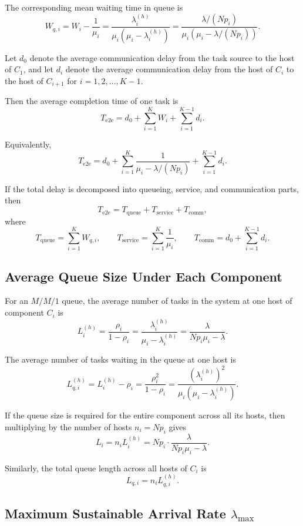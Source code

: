 \documentclass[12pt,a4paper]{article}
\begin{document}
The corresponding mean waiting time in queue is
\[
W_{q,i} = W_i - \frac{1}{\mu_i}
       = \frac{\lambda_i^{(h)}}{\mu_i\left(\mu_i-\lambda_i^{(h)}\right)}
       = \frac{\lambda/(Np_i)}{\mu_i\left(\mu_i-\lambda/(Np_i)\right)}.
\]

Let $d_0$ denote the average communication delay from the task source to the host of $C_1$, and let $d_i$ denote the average communication delay from the host of $C_i$ to the host of $C_{i+1}$ for $i=1,2,\dots,K-1$.

Then the average completion time of one task is
\[
T_{\text{e2e}} = d_0 + \sum_{i=1}^{K} W_i + \sum_{i=1}^{K-1} d_i.
\]

Equivalently,
\[
T_{\text{e2e}} = d_0 + \sum_{i=1}^{K} \frac{1}{\mu_i - \lambda/(Np_i)}
    + \sum_{i=1}^{K-1} d_i.
\]

If the total delay is decomposed into queueing, service, and communication parts, then
\[
T_{\text{e2e}} = T_{\text{queue}} + T_{\text{service}} + T_{\text{comm}},
\]
where
\[
T_{\text{queue}} = \sum_{i=1}^{K} W_{q,i}, \qquad
T_{\text{service}} = \sum_{i=1}^{K} \frac{1}{\mu_i}, \qquad
T_{\text{comm}} = d_0 + \sum_{i=1}^{K-1} d_i.
\]

\subsection{Average Queue Size Under Each Component}

For an $M/M/1$ queue, the average number of tasks in the system at one host of component $C_i$ is
\[
L_i^{(h)} = \frac{\rho_i}{1-\rho_i}
          = \frac{\lambda_i^{(h)}}{\mu_i - \lambda_i^{(h)}}
          = \frac{\lambda}{Np_i\mu_i - \lambda}.
\]

The average number of tasks waiting in the queue at one host is
\[
L_{q,i}^{(h)} = L_i^{(h)} - \rho_i
             = \frac{\rho_i^2}{1-\rho_i}
             = \frac{\left(\lambda_i^{(h)}\right)^2}{\mu_i\left(\mu_i - \lambda_i^{(h)}\right)}.
\]

If the queue size is required for the entire component across all its hosts, then multiplying by the number of hosts $n_i = Np_i$ gives
\[
L_i = n_i L_i^{(h)}
    = Np_i \cdot \frac{\lambda}{Np_i\mu_i - \lambda}.
\]

Similarly, the total queue length across all hosts of $C_i$ is
\[
L_{q,i} = n_i L_{q,i}^{(h)}.
\]

\subsection{Maximum Sustainable Arrival Rate $\lambda_{\max}$}
\end{document}

